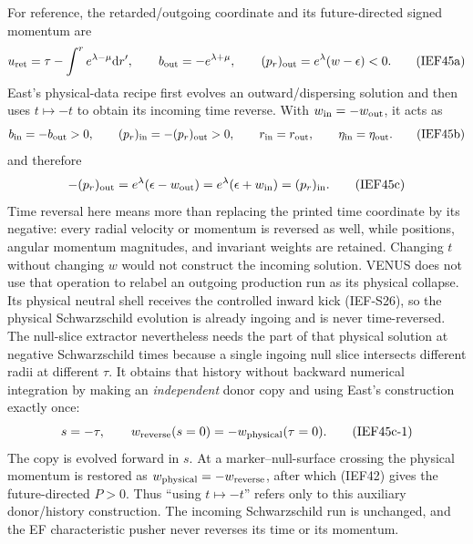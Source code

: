 For reference, the retarded/outgoing coordinate and its future-directed
signed momentum are
\[
 u_{\rm ret}=\tau-\int^r e^{\lambda-\mu}\mathrm d r',\qquad
 b_{\rm out}=-e^{\lambda+\mu},\qquad
 (p_r)_{\rm out}=e^\lambda(w-\epsilon)<0.              \tag{IEF45a}
\]
East's physical-data recipe first evolves an outward/dispersing solution and
then uses \(t\mapsto-t\) to obtain its incoming time reverse.  With
\(w_{\rm in}=-w_{\rm out}\), it acts as
\[
 b_{\rm in}=-b_{\rm out}>0,\qquad
 (p_r)_{\rm in}=-(p_r)_{\rm out}>0,\qquad
 r_{\rm in}=r_{\rm out},\qquad
 \eta_{\rm in}=\eta_{\rm out}.                        \tag{IEF45b}
\]
and therefore
\[
 -(p_r)_{\rm out}
 =e^\lambda(\epsilon-w_{\rm out})
 =e^\lambda(\epsilon+w_{\rm in})=(p_r)_{\rm in}.       \tag{IEF45c}
\]
Time reversal here means more than replacing the printed time coordinate by
its negative: every radial velocity or momentum is reversed as well, while
positions, angular momentum magnitudes, and invariant weights are retained.
Changing \(t\) without changing \(w\) would not construct the incoming
solution.
VENUS does not use that operation to relabel an outgoing production run as its
physical collapse.  Its physical neutral shell receives the controlled inward
kick (IEF-S26), so the physical Schwarzschild evolution is already ingoing and
is never time-reversed.  The null-slice extractor nevertheless needs the part
of that physical solution at negative Schwarzschild times because a single
ingoing null slice intersects different radii at different \(\tau\).  It
obtains that history without backward numerical integration by making an
\emph{independent} donor copy and using East's construction exactly once:
\[
 s=-\tau,\qquad w_{\rm reverse}(s=0)=-w_{\rm physical}(\tau=0).
                                                               \tag{IEF45c-1}
\]
The copy is evolved forward in \(s\).  At a marker--null-surface crossing the
physical momentum is restored as
\(w_{\rm physical}=-w_{\rm reverse}\), after which (IEF42) gives the
future-directed \(P>0\).  Thus ``using \(t\mapsto-t\)'' refers only to this
auxiliary donor/history construction.  The incoming Schwarzschild run is
unchanged, and the EF characteristic pusher never reverses its time or its
momentum.

